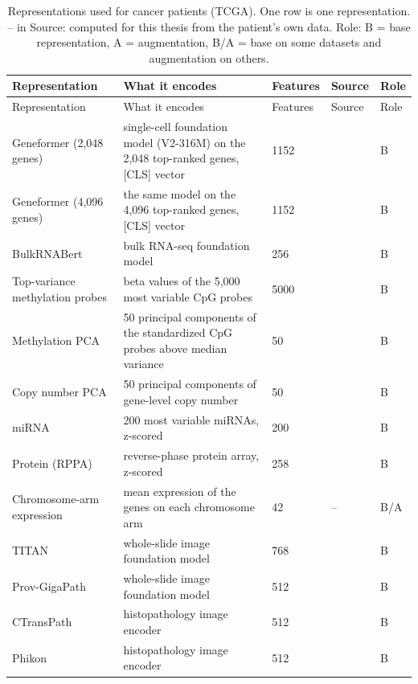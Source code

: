 \begin{longtable}{P{3.0cm}P{5.0cm}P{1.5cm}P{1.5cm}P{1.4cm}}
\caption[Representations used for cancer patients (TCGA).]{Representations used for cancer patients (TCGA). One row is one representation. -- in Source: computed for this thesis from the patient's own data. Role: B = base representation, A = augmentation, B/A = base on some datasets and augmentation on others.}\label{tab:reps_tcga}\\
\toprule
Representation & What it encodes & Features & Source & Role \\
\midrule
\endfirsthead
\toprule
Representation & What it encodes & Features & Source & Role \\
\midrule
\endhead
\bottomrule
\endfoot
Geneformer (2,048 genes) & single-cell foundation model (V2-316M) on the 2,048 top-ranked genes, [CLS] vector & 1152 & \citep{Theodoris2023, Geneformer2024card} & B \\
Geneformer (4,096 genes) & the same model on the 4,096 top-ranked genes, [CLS] vector & 1152 & \citep{Theodoris2023, Geneformer2024card} & B \\
BulkRNABert & bulk RNA-seq foundation model & 256 & \citep{Gelard2024} & B \\
Top-variance methylation probes & beta values of the 5,000 most variable CpG probes & 5000 & \citep{Goldman2020} & B \\
Methylation PCA & 50 principal components of the standardized CpG probes above median variance & 50 & \citep{Goldman2020} & B \\
Copy number PCA & 50 principal components of gene-level copy number & 50 & \citep{Mermel2011} & B \\
miRNA & 200 most variable miRNAs, z-scored & 200 & \citep{Goldman2020} & B \\
Protein (RPPA) & reverse-phase protein array, z-scored & 258 & \citep{Li2013TCPA} & B \\
Chromosome-arm expression & mean expression of the genes on each chromosome arm & 42 & -- & B/A \\
TITAN & whole-slide image foundation model & 768 & \citep{Ding2024TITAN} & B \\
Prov-GigaPath & whole-slide image foundation model & 512 & \citep{Xu2024GigaPath} & B \\
CTransPath & histopathology image encoder & 512 & \citep{Wang2022CTransPath} & B \\
Phikon & histopathology image encoder & 512 & \citep{Filiot2023} & B \\

\end{longtable}
